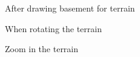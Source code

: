 \documentclass[11pt]{article}
\begin{document}
\begin{itemize}
\begin{figure}[H]
  \caption{After drawing basement for terrain}
\end{figure}
\begin{figure}[H] 
  \caption{When rotating the terrain}
\end{figure}
\begin{figure}[H] 
  \caption{Zoom in the terrain}
\end{figure}

\end{itemize}
\end{document}
